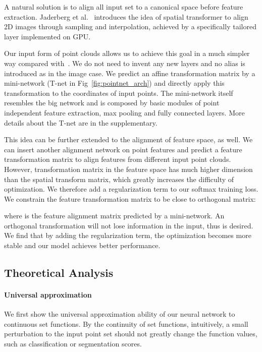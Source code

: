 \documentclass[10pt,twocolumn,letterpaper]{article}
\begin{document}
A natural solution is to align all input set to a canonical space before feature extraction. Jaderberg et al.~\cite{jaderberg2015spatial} introduces the idea of spatial transformer to align 2D images through sampling and interpolation, achieved by a specifically tailored layer implemented on GPU.

Our input form of point clouds allows us to achieve this goal in a much simpler way compared with~\cite{jaderberg2015spatial}. We do not need to invent any new layers and no alias is introduced as in the image case. We predict an affine transformation matrix by a mini-network (T-net in Fig~\ref{fig:pointnet_arch}) and directly apply this transformation to the coordinates of input points. The mini-network itself resembles the big network and is composed by basic modules of point independent feature extraction, max pooling and fully connected layers. More details about the T-net are in the supplementary.

This idea can be further extended to the alignment of feature space, as well. We can insert another alignment network on point features and predict a feature transformation matrix to align features from different input point clouds. However, transformation matrix in the feature space has much higher dimension than the spatial transform matrix, which greatly increases the difficulty of optimization. We therefore add a regularization term to our softmax training loss. We constrain the feature transformation matrix to be close to orthogonal matrix:

where  is the feature alignment matrix predicted by a mini-network. An orthogonal transformation will not lose information in the input, thus is desired. We find that by adding the regularization term, the optimization becomes more stable and our model achieves better performance.


\subsection{Theoretical Analysis}
\label{sec:theory}
 
\paragraph{Universal approximation} We first show the universal approximation ability of our neural network to continuous set functions. By the continuity of set functions, intuitively, a small perturbation to the input point set should not greatly change the function values, such as classification or segmentation scores.
\end{document}

